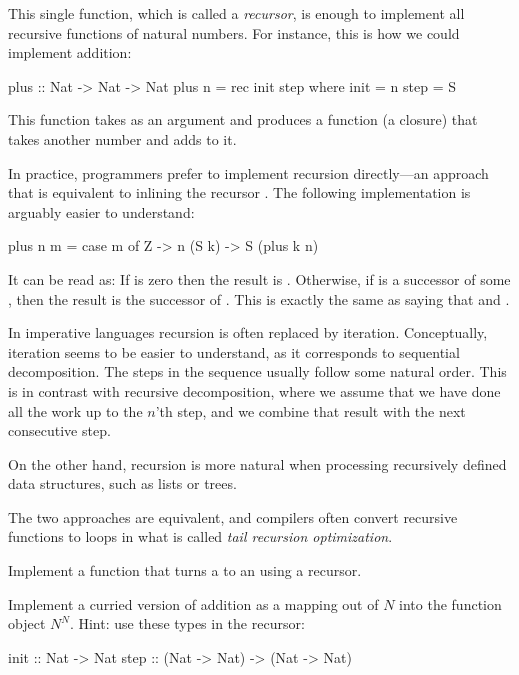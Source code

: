 \documentclass[DaoFP]{subfiles}
\begin{document}
This single function, which is called a \emph{recursor}, is enough to implement all recursive functions of natural numbers. For instance, this is how we could implement addition:

\begin{haskell}
plus :: Nat -> Nat -> Nat
plus n = rec init step
  where
    init = n
    step = S
\end{haskell}
This function takes  as an argument and produces a function (a closure) that takes another number and adds   to it. 

In practice, programmers prefer to implement recursion directly---an approach that is equivalent to inlining the recursor . The following implementation is arguably easier to understand:
\begin{haskell}
plus n m = case m of
  Z -> n
  (S k) -> S (plus k n)
\end{haskell}
It can be read as: If  is zero then the result is . Otherwise, if  is a successor of some , then the result is the successor of  . This is exactly the same as saying that  and .

In imperative languages recursion is often replaced by iteration. Conceptually, iteration seems to be easier to understand, as it corresponds to sequential decomposition. The steps in the sequence usually follow some natural order. This is in contrast with recursive decomposition, where we assume that we have done all the work up to the $n$'th step, and we combine that result with the next consecutive step. 

On the other hand, recursion is more natural when processing recursively defined data structures, such as lists or trees. 

The two approaches are equivalent, and compilers often convert recursive functions to loops in what is called \emph{tail recursion optimization}.

\begin{exercise}
Implement a function that turns a  to an  using a recursor.
\end{exercise}

\begin{exercise}
Implement a curried version of addition as a mapping out of $N$ into the function object $N^N$. Hint: use these types in the recursor:
\begin{haskell}
init :: Nat -> Nat
step :: (Nat -> Nat) -> (Nat -> Nat)
\end{haskell}

\end{exercise}
\end{document}
